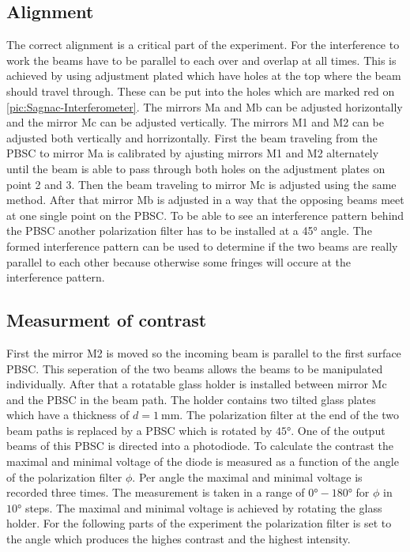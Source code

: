 \subsection{Alignment}
The correct alignment is a critical part of the experiment. For the interference to work the beams have to be parallel to each over and 
overlap at all times. This is achieved by using adjustment plated which have holes at the top where the beam should travel through. 
These can be put into the holes which are marked red on \autoref{pic:Sagnac-Interferometer}. The mirrors Ma and Mb can be adjusted horizontally
and the mirror Mc can be adjusted vertically. The mirrors M1 and M2 can be adjusted both vertically and horrizontally. 
First the beam traveling from 
the PBSC to mirror Ma is calibrated by ajusting mirrors M1 and M2 alternately until the beam is able to pass through both holes on the 
adjustment plates on point 2 and 3. Then the beam traveling to mirror Mc is adjusted using the same method. After that mirror Mb
is adjusted in a way that the opposing beams meet at one single point on the PBSC. To be able to see an interference pattern behind the PBSC 
another polarization filter has to be installed at a 45° angle. The formed interference pattern can be used to determine if the two beams 
are really parallel to each other because otherwise some fringes will occure at the interference pattern. 

\subsection{Measurment of contrast}
First the mirror M2 is moved so the incoming beam is parallel to the first surface PBSC. This seperation of the two beams allows the beams 
to be manipulated individually. After that a rotatable glass holder is installed between mirror Mc and the PBSC in the beam path. 
The holder contains two tilted glass plates which have a thickness of $d = \SI{1}{\milli\meter}$. The polarization filter at the end 
of the two beam paths is replaced by a PBSC which is rotated by $45°$. One of the output beams of this PBSC is directed into a 
photodiode. To calculate the contrast the maximal and minimal voltage of the diode is measured as a function of the angle of the 
polarization filter $\phi$. Per angle the maximal and minimal voltage is recorded three times. The measurement is taken in a range 
of $0° - 180°$ for $\phi$ in $10°$ steps. The maximal and minimal voltage is achieved by rotating the glass holder. 
For the following parts of the experiment the polarization filter is set to the angle which produces the highes contrast and the 
highest intensity. 

